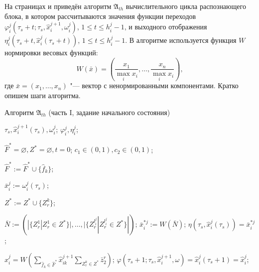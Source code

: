 На страницах \pageref{alg:th_init} и \pageref{alg:th_cycle} приведён алгоритм $\mathfrak{A}_{th}$ вычислительного цикла распознающего блока, в котором рассчитываются значения функции переходов $\varphi_i^j(\tau_s+t;\tau_s,\hat{x}_i^{j+1},\omega_i^j)$, $1\leqslant{t}\leqslant h_i^j-1$, и выходного отображения $\eta_i^j(\tau_s+t,\hat{x}_i^j(\tau_s+t))$, $1\leqslant{t}\leqslant h_i^j-1$. В алгоритме используется функция $W$ нормировки весовых функций:
\[
	W(\bar x)=\left(\frac{x_1}{\max\limits_i x_i},\dots,\frac{x_n}{\max\limits_i x_i}\right),
\] 
где $\bar x=(x_1,\dots,x_n)$ "--- вектор с ненормированными компонентами. Кратко опишем шаги алгоритма.

\begin{algorithm}[H]
	\caption{Алгоритм $\mathfrak{A}_{th}$ (часть I, задание начального состояния)}\label{alg:th_init}
	\begin{algorithmic}[1]
		\Require $\tau_s, \hat{x}_i^{j+1}(\tau_s), \omega_i^j$;
		\Ensure $\varphi_i^j, \eta_i^j$;
		
		\State $\hat{F}^*=\varnothing,Z^*=\varnothing,t=0$;
		\State $c_1\in(0,1), c_2\in(0,1)$;
		
		 \label{alst:init_start}
			 \label{alst:select_f}
				\State $\hat{F}^*:=\hat{F}^*\cup\{\hat{f}_k\}$;
			\EndIf
		\EndFor
		
		\State $\bar x_i^j:=\omega_i^j(\tau_s)$;
		
				 \label{alst:select_z}
					\State $Z^*:=Z^*\cup\{Z_r^k\}$;
				\EndIf
			\EndFor
		\EndFor
		
		\State $\bar N:=(|\{Z_r^1|Z_r^1\in Z^*\}|,\dots,|\{Z_r^{l_i^j}|Z_r^{l_i^j}\in Z^*\}|)$; \label{alst:init_calc_out1}
		\State $\bar{x}_i^{*j}:=W(\bar N)$; \label{init_alst:calc_out2}
		\State $\eta(\tau_s, \hat{x}_i^j(\tau_s))=\bar{x}_i^{*j}$; \label{alst:init_calc_out3}
		
		\State $\hat x_i^j=W(\sum_{\hat f_k\in\hat F^*}\hat x_{ik}^{j+1}\sum_{Z_r^k\in Z^*}\bar z_2^r)$; \label{alst:init_state}
		\State $\varphi(\tau_s+1;\tau_s,\hat{x}_i^{j+1}, \omega)=\hat{x}_i^j(\tau_s+1)=\hat{x}_i^j$;\label{alst:init_end}			
	\end{algorithmic}
\end{algorithm}

